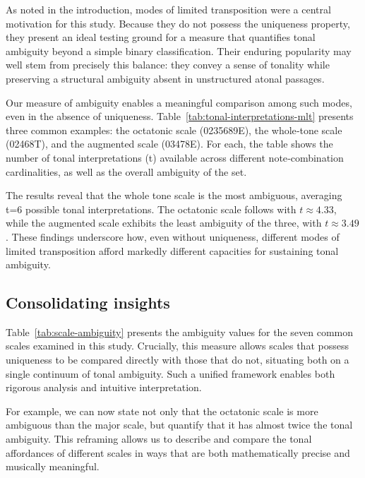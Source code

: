 \documentclass[10pt,twocolumn]{article}
\numberwithin{equation}{section} %
\begin{document}
    As noted in the introduction, modes of limited transposition were a central motivation for this study.
    Because they do not possess the uniqueness property, they present an ideal testing ground for a measure that quantifies tonal ambiguity beyond a simple binary classification.
    Their enduring popularity may well stem from precisely this balance: they convey a sense of tonality while preserving a structural ambiguity absent in unstructured atonal passages.

    Our measure of ambiguity enables a meaningful comparison among such modes, even in the absence of uniqueness.
    Table~\ref{tab:tonal-interpretations-mlt} presents three common examples: the octatonic scale (0235689E), the whole‑tone scale (02468T), and the augmented scale (03478E).
    For each, the table shows the number of tonal interpretations (t) available across different note‑combination cardinalities, as well as the overall ambiguity of the set.

    The results reveal that the whole tone scale is the most ambiguous, averaging t=6 possible tonal interpretations.
    The octatonic scale follows with $t \approx 4.33$, while the augmented scale exhibits the least ambiguity of the three, with $t \approx 3.49$.
    These findings underscore how, even without uniqueness, different modes of limited transposition afford markedly different capacities for sustaining tonal ambiguity.

    

    \subsection{Consolidating insights}

    Table~\ref{tab:scale-ambiguity} presents the ambiguity values for the seven common scales examined in this study.
    Crucially, this measure allows scales that possess uniqueness to be compared directly with those that do not, situating both on a single continuum of tonal ambiguity.
    Such a unified framework enables both rigorous analysis and intuitive interpretation.

    For example, we can now state not only that the octatonic scale is more ambiguous than the major scale, but quantify that it has almost twice the tonal ambiguity.
    This reframing allows us to describe and compare the tonal affordances of different
    scales in ways that are both mathematically precise and musically meaningful.
\end{document}
